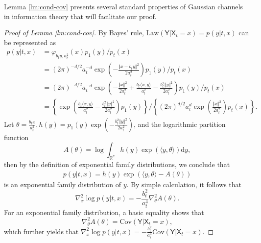 \documentclass[twoside,11pt]{article}
\def\sR{{\mathbb{R}}}
\newcommand{\Cov}{\mathrm{Cov}}
\newcommand{\diff}{\mathrm{d}}
\numberwithin{equation}{section}
\begin{document}
Lemma \ref{lm:cond-cov} presents several standard properties of Gaussian channels in information theory \citep{wibisono2018convexity-heat, wibisono2018convexity-ou, dytso2023conditional} that will facilitate our proof.

\begin{proof} [Proof of Lemma \ref{lm:cond-cov}]
{\color{black}
By Bayes' rule, $\mathrm{Law} (\mathsf{Y} | \mathsf{X}_t = x) = p(y | t, x)$ can be represented as
\begin{align*}
    p(y | t, x)
    & = \varphi_{b_t y, a_t^2} (x) p_1(y) / p_t(x) \\
    & = (2 \pi)^{-d/2} a_t^{-d} \exp\left( -\frac{\Vert x - b_t y \Vert^2}{2 a_t^2} \right) p_1(y) / p_t(x) \\
    & = (2 \pi)^{-d/2} a_t^{-d} \exp\left( -\frac{\Vert x \Vert^2}{2 a_t^2} + \frac{b_t \langle x, y \rangle}{a_t^2} - \frac{b_t^2 \Vert y \Vert^2}{2 a_t^2} \right) p_1(y) / p_t(x) \\
    & = \left\{ \exp\left( \frac{b_t \langle x, y \rangle}{a_t^2} - \frac{b_t^2 \Vert y \Vert^2}{2 a_t^2} \right) p_1(y) \right\}
    / \left\{ (2 \pi)^{d/2} a_t^d \exp\left(\frac{\Vert x \Vert^2}{2 a_t^2}\right) p_t(x) \right\}.
\end{align*}
Let $\theta = \frac{b_t x}{a_t^2}, h(y) = p_1(y) \exp(-\frac{b_t^2 \Vert y \Vert^2}{2 a_t^2})$, and the logarithmic partition function
\begin{equation*}
    A(\theta) = \log \int_{\sR^d} h(y) \exp(\langle y, \theta \rangle) \diff y,
\end{equation*}
then by the definition of exponential family distributions, we conclude that
\begin{align*}
    p(y | t, x) = h(y) \exp(\langle y, \theta \rangle - A(\theta))
\end{align*}
is an exponential family distribution of $y$.}
By simple calculation, it follows that
\begin{equation*}
    \nabla^2_x \log p(y | t, x) =  - \frac{b_t^2}{a_t^4} \nabla^2_{\theta} A(\theta).
\end{equation*}
For an exponential family distribution, a basic equality shows that
\begin{equation*}
    \nabla^2_{\theta} A(\theta) = \Cov (\mathsf{Y} | \mathsf{X}_t = x),
\end{equation*}
which further yields that $\nabla^2_x \log p(y | t, x) = - \frac{b_t^2}{a_t^4} \Cov (\mathsf{Y} | \mathsf{X}_t = x)$.
\end{proof}
\end{document}
